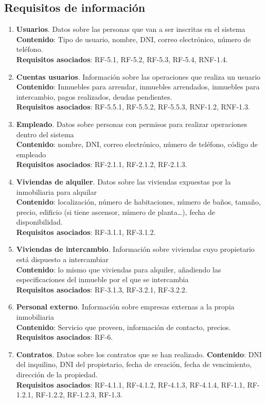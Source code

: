 \documentclass[10pt,a4paper]{article}
\begin{document}
{\subsection*{Requisitos de información}
\begin{enumerate}[\bfseries R{I}-1]
\item \textbf{Usuarios}. Datos sobre las personas que van a ser inscritas en el sistema\\
\textbf{Contenido}: Tipo de usuario, nombre, DNI, correo electrónico, número de teléfono.
\\
\textbf{Requisitos asociados}: RF-5.1, RF-5.2, RF-5.3, RF-5.4, RNF-1.4.
\item \textbf{Cuentas usuarios}. Información sobre las operaciones que realiza un usuario\\
\textbf{Contenido}: Inmuebles para arrendar, inmuebles arrendados, inmuebles para intercambio, pagos realizados, deudas pendientes.\\
\textbf{Requisitos asociados}: RF-5.5.1, RF-5.5.2, RF-5.5.3, RNF-1.2, RNF-1.3.
\item \textbf{Empleado}. Datos sobre personas con permisos para realizar operaciones dentro del sistema\\
\textbf{Contenido}: nombre, DNI, correo electrónico, número de teléfono, código de empleado\\
\textbf{Requisitos asociados}: RF-2.1.1, RF-2.1.2, RF-2.1.3.
\item \textbf{Viviendas de alquiler}. Datos sobre las viviendas expuestas por la inmobiliaria para alquilar\\
\textbf{Contenido}: localización, número de habitaciones, número de baños, tamaño, precio, edificio (si tiene ascensor, número de planta…), fecha de disponibilidad.\\
\textbf{Requisitos asociados}: RF-3.1.1, RF-3.1.2.
\item \textbf{Viviendas de intercambio}. Información sobre viviendas cuyo propietario está dispuesto a intercambiar\\
\textbf{Contenido}: lo mismo que viviendas para alquiler, añadiendo las especificaciones del inmueble por el que se intercambia\\
\textbf{Requisitos asociados}: RF-3.1.3, RF-3.2.1, RF-3.2.2.
\item \textbf{Personal externo}. Información sobre empresas externas a la propia inmobiliaria\\
\textbf{Contenido}: Servicio que proveen, información de contacto, precios.\\
\textbf{Requisitos asociados}: RF-6.
\item \textbf{Contratos}. Datos sobre los contratos que se han realizado.
\textbf{Contenido}: DNI del inquilino, DNI del propietario, fecha de creación, fecha de vencimiento, dirección de la propiedad.\\
\textbf{Requisitos asociados}: RF-4.1.1, RF-4.1.2, RF-4.1.3, RF-4.1.4, RF-1.1, RF-1.2.1, RF-1.2.2, RF-1.2.3, RF-1.3.
\end{enumerate}

}
\end{document}
